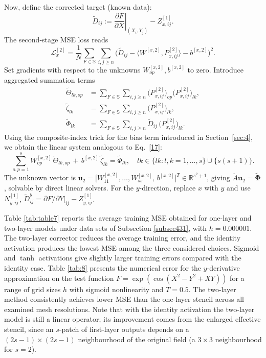 \documentclass[pdflatex,sn-mathphys-num]{sn-jnl}%
\theoremstyle{thmstyleone}%
\theoremstyle{thmstyletwo}%
\theoremstyle{thmstylethree}%
\begin{document}
{Now, define the corrected target (known data):
\[
\tilde D_{ij} := \left.\frac{\partial F}{\partial X}\right|_{(X_i,Y_j)} - Z_{x,ij}^{[1]}.
\]
The second‑stage MSE loss reads
\[
\mathcal L_x^{[2]}=\frac1N\sum_{F\in\mathbb S}\sum_{i,j\ge n}\Big(\tilde D_{ij}-\langle W^{[x,2]},P_{x,ij}^{[2]}\rangle-b^{[x,2]}\Big)^2.
\]
Set gradients with respect to the unknowns $W^{[x,2]}_{op},b^{[x,2]}$ to zero.
Introduce aggregated summation terms
\[
\begin{aligned}
\widetilde\Theta_{lk,op} &= \sum_{F\in\mathbb S}\sum_{i,j\ge n} \big(P_{x,ij}^{[2]}\big)_{op}\big(P_{x,ij}^{[2]}\big)_{lk},\\
\widetilde\zeta_{lk} &= \sum_{F\in\mathbb S}\sum_{i,j\ge n} \big(P_{x,ij}^{[2]}\big)_{lk},\\
\widetilde\Phi_{lk} &= \sum_{F\in\mathbb S}\sum_{i,j\ge n} \tilde D_{ij}\,\big(P_{x,ij}^{[2]}\big)_{lk}.
\end{aligned}
\]
Using the composite‑index trick for the bias term introduced in Section~\ref{sec:4}, we obtain the linear system analogous to Eq.~\eqref{17}:
\begin{equation}
\sum_{o,p=1}^{s} W^{[x,2]}_{op}\,\widetilde\Theta_{lk,op}
\,+\, b^{[x,2]}\,\widetilde\zeta_{lk}
=\widetilde\Phi_{lk},\quad
lk\in\big\{lk:l,k=1,\dots,s\big\}\cup\big\{s(s+1)\big\}.
\label{eq:17_second_layer}
\end{equation}
The unknown vector is $\mathbf u_2=\big[W^{[x,2]}_{11},\dots,W^{[x,2]}_{ss},\,b^{[x,2]}\big]^T\in\mathbb R^{s^2+1}$, giving $\widetilde A\mathbf u_2=\widetilde{\boldsymbol\Phi}$, solvable by direct linear solvers.
For the $y$-direction, replace $x$ with $y$ and use $N_{y,ij}^{[1]}$, $\tilde D_{ij}^y=\left.\partial F/\partial Y\right|_{ij}-Z_{y,ij}^{[1]}$.

Table \ref{tab:table7} reports the average training MSE obtained for one-layer and two-layer models under data sets of Subsection \ref{subsec431}, with \(h=0.000001\). The two-layer corrector reduces the average training error, and the identity activation produces the lowest MSE among the three considered choices. Sigmoid and $\tanh$ activations give slightly larger training errors compared with the identity case. Table \ref{tab:8} presents the numerical error for the $y$-derivative approximation on the test function $F=\exp(\cos(X^2-Y^2+XY))$ for a range of grid sizes $h$ with sigmoid nonlinearity and $T=0.5$. The two-layer method consistently achieves lower MSE than the one-layer stencil across all examined mesh resolutions. Note that with the identity activation the two-layer model is still a linear operator; its improvement comes from the enlarged effective stencil, since an $s$-patch of first-layer outputs depends on a $(2s-1)\times(2s-1)$ neighbourhood of the original field (a $3\times 3$ neighbourhood for $s=2$).

}
\end{document}
